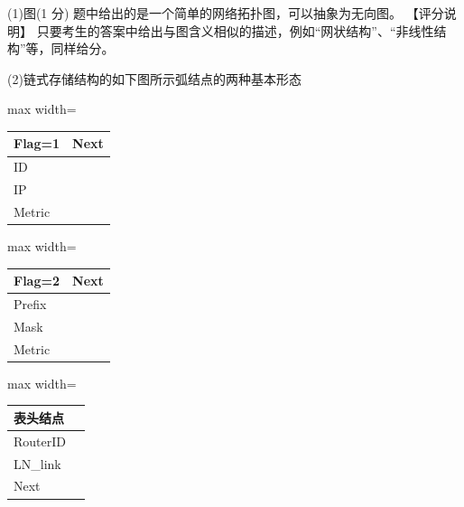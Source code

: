 \documentclass[UTF8,11pt]{ctexart}
\begin{document}
(1)图(1 分) 题中给出的是一个简单的网络拓扑图，可以抽象为无向图。 【评分说明】 只要考生的答案中给出与图含义相似的描述，例如“网状结构”、“非线性结构”等，同样给分。


(2)链式存储结构的如下图所示弧结点的两种基本形态


\begin{center}\begin{adjustbox}{max width=\linewidth}\begin{tabular}{|>{\raggedright\arraybackslash}p{\dimexpr(\linewidth-4\tabcolsep-3\arrayrulewidth)/2\relax}|>{\raggedright\arraybackslash}p{\dimexpr(\linewidth-4\tabcolsep-3\arrayrulewidth)/2\relax}|}\hline
Flag=1 & Next\\\hline
ID & \\\hline
IP & \\\hline
Metric & \\\hline\end{tabular}\end{adjustbox}\end{center}

\begin{center}\begin{adjustbox}{max width=\linewidth}\begin{tabular}{|>{\raggedright\arraybackslash}p{\dimexpr(\linewidth-4\tabcolsep-3\arrayrulewidth)/2\relax}|>{\raggedright\arraybackslash}p{\dimexpr(\linewidth-4\tabcolsep-3\arrayrulewidth)/2\relax}|}\hline
Flag=2 & Next\\\hline
Prefix & \\\hline
Mask & \\\hline
Metric & \\\hline\end{tabular}\end{adjustbox}\end{center}

\begin{center}\begin{adjustbox}{max width=\linewidth}\begin{tabular}{|>{\raggedright\arraybackslash}p{\dimexpr(\linewidth-4\tabcolsep-3\arrayrulewidth)/2\relax}|>{\raggedright\arraybackslash}p{\dimexpr(\linewidth-4\tabcolsep-3\arrayrulewidth)/2\relax}|}\hline
表头结点 & \\\hline
RouterID & \\\hline
LN\_link & \\\hline
Next & \\\hline\end{tabular}\end{adjustbox}\end{center}
\end{document}
